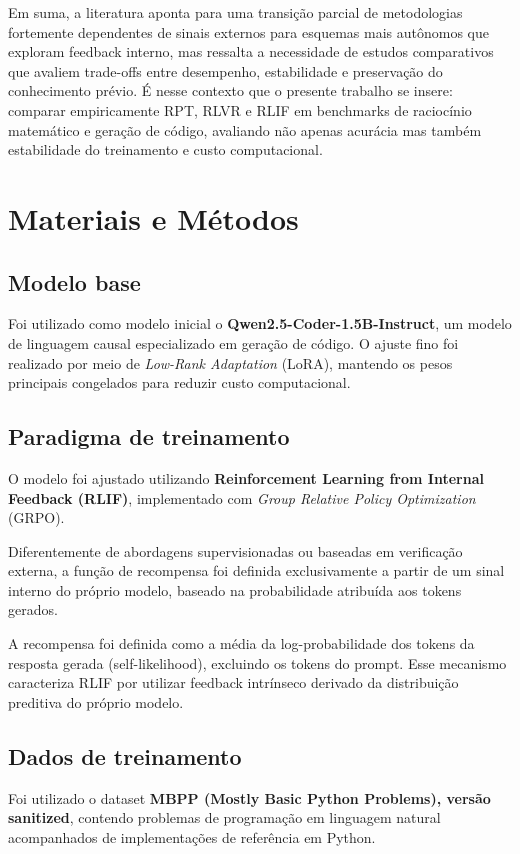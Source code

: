 \documentclass[11pt,a4paper]{article}
\begin{document}
Em suma, a literatura aponta para uma transição parcial de metodologias fortemente dependentes de sinais externos para esquemas mais autônomos que exploram feedback interno, mas ressalta a necessidade de estudos comparativos que avaliem trade-offs entre desempenho, estabilidade e preservação do conhecimento prévio. É nesse contexto que o presente trabalho se insere: comparar empiricamente RPT, RLVR e RLIF em benchmarks de raciocínio matemático e geração de código, avaliando não apenas acurácia mas também estabilidade do treinamento e custo computacional.

\section{Materiais e Métodos}

\subsection{Modelo base}
Foi utilizado como modelo inicial o \textbf{Qwen2.5-Coder-1.5B-Instruct}, um modelo de linguagem causal especializado em geração de código. O ajuste fino foi realizado por meio de \textit{Low-Rank Adaptation} (LoRA), mantendo os pesos principais congelados para reduzir custo computacional.

\subsection{Paradigma de treinamento}
O modelo foi ajustado utilizando \textbf{Reinforcement Learning from Internal Feedback (RLIF)}, implementado com \textit{Group Relative Policy Optimization} (GRPO).

Diferentemente de abordagens supervisionadas ou baseadas em verificação externa, a função de recompensa foi definida exclusivamente a partir de um sinal interno do próprio modelo, baseado na probabilidade atribuída aos tokens gerados.

A recompensa foi definida como a média da log-probabilidade dos tokens da resposta gerada (self-likelihood), excluindo os tokens do prompt. Esse mecanismo caracteriza RLIF por utilizar feedback intrínseco derivado da distribuição preditiva do próprio modelo.

\subsection{Dados de treinamento}
Foi utilizado o dataset \textbf{MBPP (Mostly Basic Python Problems), versão sanitized}, contendo problemas de programação em linguagem natural acompanhados de implementações de referência em Python.
\end{document}
